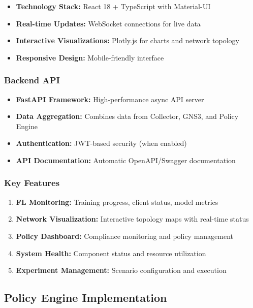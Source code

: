 \documentclass[12pt,a4paper,twoside]{article}
\begin{document}
\begin{itemize}
    \item \textbf{Technology Stack:} React 18 + TypeScript with Material-UI
    \item \textbf{Real-time Updates:} WebSocket connections for live data
    \item \textbf{Interactive Visualizations:} Plotly.js for charts and network topology
    \item \textbf{Responsive Design:} Mobile-friendly interface
\end{itemize}

\subsubsection{Backend API}

\begin{itemize}
    \item \textbf{FastAPI Framework:} High-performance async API server
    \item \textbf{Data Aggregation:} Combines data from Collector, GNS3, and Policy Engine
    \item \textbf{Authentication:} JWT-based security (when enabled)
    \item \textbf{API Documentation:} Automatic OpenAPI/Swagger documentation
\end{itemize}

\subsubsection{Key Features}

\begin{enumerate}
    \item \textbf{FL Monitoring:} Training progress, client status, model metrics
    \item \textbf{Network Visualization:} Interactive topology maps with real-time status
    \item \textbf{Policy Dashboard:} Compliance monitoring and policy management
    \item \textbf{System Health:} Component status and resource utilization
    \item \textbf{Experiment Management:} Scenario configuration and execution
\end{enumerate}

\subsection{Policy Engine Implementation}
\end{document}
